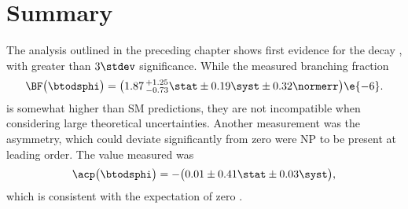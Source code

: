 \section{Summary}
\label{sec:dsphi:conc}

The analysis outlined in the preceding chapter shows first evidence for the decay \btodsphi, with
greater than $3\stdev$ significance.
While the measured branching fraction
\begin{equation*}
  \BF\big(\btodsphi\big) =
  \big(1.87\,^{+1.25}_{-0.73}\stat\pm0.19\syst\pm0.32\normerr\big)\e{-6}.
  \label{eq:dsphi:result}
\end{equation*}
is somewhat higher than SM predictions, they are not incompatible when considering large
theoretical uncertainties.
Another measurement was the \CP asymmetry, which could deviate significantly from zero were NP to
be present at leading order.
The value measured was
\begin{equation*}
  \acp\big(\btodsphi\big)=
  -\big(0.01\pm0.41\stat\pm0.03\syst\big),
\end{equation*}
which is consistent with the \sm expectation of zero \CPV.







